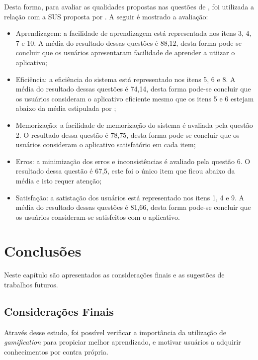 \documentclass[
	12pt,				%
	openany,			%
	oneside,			%
	a4paper,			%
	english,			%
	french,				%
	spanish,			%
	brazil				%
	]{abntex2}
\begin{document}
Desta forma, para avaliar as qualidades propostas nas questões de , foi utilizada a relação com a SUS proposta por . A seguir é mostrado a avaliação:

\begin{itemize}
\item Aprendizagem: a facilidade de aprendizagem está representada nos itens 3, 4, 7 e 10. A média do resultado dessas questões é 88,12, desta forma pode-se concluir que os usuários apresentaram facilidade de aprender a utiizar o aplicativo;
\item Eficiência: a eficiência do sistema está representado nos itens 5, 6 e 8. A média do resultado dessas questões é 74,14, desta forma pode-se concluir que os usuários consideram o aplicativo eficiente mesmo que os itens 5 e 6 estejam abaixo da média estipulada por ;
\item Memorização: a facilidade de memorização do sistema é avaliada pela questão 2. O resultado dessa questão é 78,75, desta forma pode-se concluir que os usuários consideram o aplicativo satisfatório em cada item;
\item Erros: a minimização dos erros e inconsistências é avaliado pela questão 6. O resultado dessa questão é 67,5, este foi o único item que ficou abaixo da média e isto requer atenção;
\item Satisfação: a satistação dos usuários está representado nos itens 1, 4 e 9. A média do resultado dessas questões é 81,66, desta forma pode-se concluir que os usuários consideram-se satisfeitos com o aplicativo.

\end{itemize}







\chapter{Conclusões}

Neste capítulo são apresentados as considerações finais e as sugestões de trabalhos futuros.


\section {Considerações Finais}


Através desse estudo, foi possível verificar a importância da utilização de \textit{gamification} para propiciar melhor aprendizado, e motivar usuários a adquirir conhecimentos por contra própria.
\end{document}
